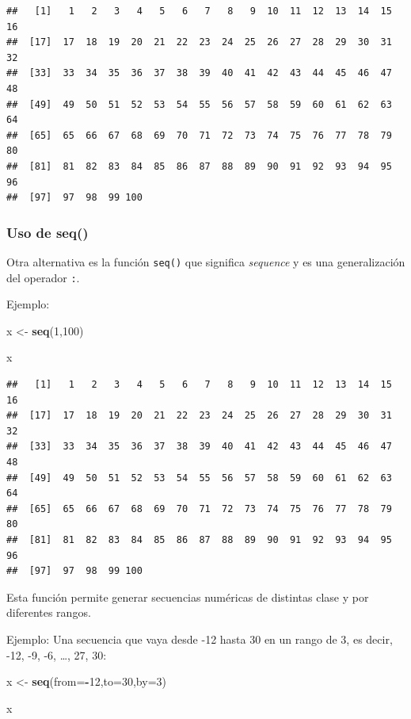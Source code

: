 \documentclass[
]{book}
\newenvironment{Shaded}{\begin{snugshade}}{\end{snugshade}}
\newcommand{\AttributeTok}[1]{\textcolor[rgb]{0.13,0.29,0.53}{#1}}
\newcommand{\DecValTok}[1]{\textcolor[rgb]{0.00,0.00,0.81}{#1}}
\newcommand{\FunctionTok}[1]{\textcolor[rgb]{0.13,0.29,0.53}{\textbf{#1}}}
\newcommand{\NormalTok}[1]{#1}
\newcommand{\OtherTok}[1]{\textcolor[rgb]{0.56,0.35,0.01}{#1}}
\newcommand{\SpecialCharTok}[1]{\textcolor[rgb]{0.81,0.36,0.00}{\textbf{#1}}}
\begin{document}
\begin{verbatim}
##   [1]   1   2   3   4   5   6   7   8   9  10  11  12  13  14  15  16
##  [17]  17  18  19  20  21  22  23  24  25  26  27  28  29  30  31  32
##  [33]  33  34  35  36  37  38  39  40  41  42  43  44  45  46  47  48
##  [49]  49  50  51  52  53  54  55  56  57  58  59  60  61  62  63  64
##  [65]  65  66  67  68  69  70  71  72  73  74  75  76  77  78  79  80
##  [81]  81  82  83  84  85  86  87  88  89  90  91  92  93  94  95  96
##  [97]  97  98  99 100
\end{verbatim}

\subsubsection{Uso de seq()}\label{uso-de-seq}

Otra alternativa es la función \texttt{seq()} que significa \emph{sequence} y es una generalización del operador \texttt{:}.

Ejemplo:

\begin{Shaded}
\begin{Highlighting}[]
\NormalTok{x }\OtherTok{\textless{}{-}} \FunctionTok{seq}\NormalTok{(}\DecValTok{1}\NormalTok{,}\DecValTok{100}\NormalTok{)}

\NormalTok{x}
\end{Highlighting}
\end{Shaded}

\begin{verbatim}
##   [1]   1   2   3   4   5   6   7   8   9  10  11  12  13  14  15  16
##  [17]  17  18  19  20  21  22  23  24  25  26  27  28  29  30  31  32
##  [33]  33  34  35  36  37  38  39  40  41  42  43  44  45  46  47  48
##  [49]  49  50  51  52  53  54  55  56  57  58  59  60  61  62  63  64
##  [65]  65  66  67  68  69  70  71  72  73  74  75  76  77  78  79  80
##  [81]  81  82  83  84  85  86  87  88  89  90  91  92  93  94  95  96
##  [97]  97  98  99 100
\end{verbatim}

Esta función permite generar secuencias numéricas de distintas clase y por diferentes rangos.

Ejemplo:
Una secuencia que vaya desde -12 hasta 30 en un rango de 3, es decir, -12, -9, -6, \ldots, 27, 30:

\begin{Shaded}
\begin{Highlighting}[]
\NormalTok{x }\OtherTok{\textless{}{-}} \FunctionTok{seq}\NormalTok{(}\AttributeTok{from=}\SpecialCharTok{{-}}\DecValTok{12}\NormalTok{,}\AttributeTok{to=}\DecValTok{30}\NormalTok{,}\AttributeTok{by=}\DecValTok{3}\NormalTok{)}

\NormalTok{x}
\end{Highlighting}
\end{Shaded}
\end{document}
